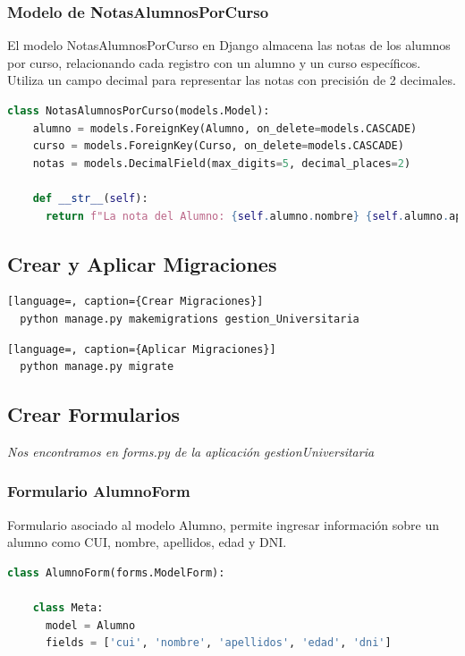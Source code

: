 \documentclass{article}
\begin{document}

  \subsubsection{Modelo de NotasAlumnosPorCurso}
  El modelo NotasAlumnosPorCurso en Django almacena las notas de los alumnos por curso, relacionando cada 
  registro con un alumno y un curso específicos. Utiliza un campo decimal para representar las notas con precisión de 2 decimales.
  \begin{lstlisting}[language=python, caption={Modelo NotasAlumnosPorCurso}]
  class NotasAlumnosPorCurso(models.Model):
    alumno = models.ForeignKey(Alumno, on_delete=models.CASCADE)
    curso = models.ForeignKey(Curso, on_delete=models.CASCADE)
    notas = models.DecimalField(max_digits=5, decimal_places=2)
    
    def __str__(self):
      return f"La nota del Alumno: {self.alumno.nombre} {self.alumno.apellidos}, es = {self.notas}"
  \end{lstlisting}
  \newpage
  

  \subsection{Crear y Aplicar Migraciones}
  \begin{lstlisting}[language=, caption={Crear Migraciones}]
  python manage.py makemigrations gestion_Universitaria
  \end{lstlisting}
  \begin{lstlisting}[language=, caption={Aplicar Migraciones}]
  python manage.py migrate
  \end{lstlisting}
  

  \subsection{Crear Formularios}
  \textit{Nos encontramos en forms.py de la aplicación gestionUniversitaria}
  

  \subsubsection{Formulario AlumnoForm}
  Formulario asociado al modelo Alumno, permite ingresar información sobre un alumno como CUI, nombre, apellidos, edad y DNI.
  \begin{lstlisting}[language=python, caption={Formulario AlumnoForm}]
  class AlumnoForm(forms.ModelForm):
  
    class Meta:
      model = Alumno
      fields = ['cui', 'nombre', 'apellidos', 'edad', 'dni']
  \end{lstlisting}
  
\end{document}
